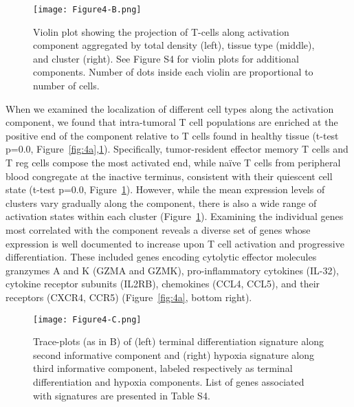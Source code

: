 \begin{figure}
\centering
\texttt{[image: Figure4-B.png]}
\caption{Violin plot showing the projection of T-cells along activation component aggregated by total density (left), tissue type (middle), and cluster (right).
See Figure S4 for violin plots for additional components.
Number of dots inside each violin are proportional to number of cells.}
\label{fig:4b}
\end{figure}

When we examined the localization of different cell types along the activation component, we found that intra-tumoral T cell populations are enriched at the positive end of the component relative to T cells found in healthy tissue (t-test p=0.0, Figure~\ref{fig:4a},\ref{fig:4b}).
Specifically, tumor-resident effector memory T cells and T reg cells compose the most activated end, while naïve T cells from peripheral blood congregate at the inactive terminus, consistent with their quiescent cell state (t-test p=0.0, Figure~\ref{fig:4b}).
However, while the mean expression levels of clusters vary gradually along the component, there is also a wide range of activation states within each cluster (Figure~\ref{fig:4b}).
Examining the individual genes most correlated with the component reveals a diverse set of genes whose expression is well documented to increase upon T cell activation and progressive differentiation.
These included genes encoding cytolytic effector molecules granzymes A and K (GZMA and GZMK), pro-inflammatory cytokines (IL-32), cytokine receptor subunits (IL2RB), chemokines (CCL4, CCL5), and their receptors (CXCR4, CCR5) (Figure~\ref{fig:4a}, bottom right).
\begin{figure}
\centering
\texttt{[image: Figure4-C.png]}
\caption{Trace-plots (as in B) of (left) terminal differentiation signature along second informative component and (right) hypoxia signature along third informative component, labeled respectively as terminal differentiation and hypoxia components.
List of genes associated with signatures are presented in Table S4.}
\label{fig:4c}
\end{figure}

